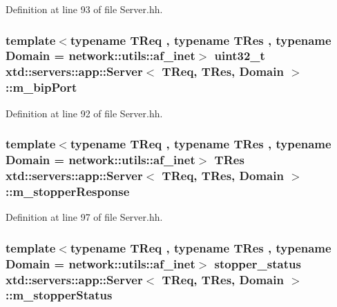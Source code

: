 Definition at line 93 of file Server.\-hh.

\hypertarget{classxtd_1_1servers_1_1app_1_1Server_a849adda20d929ad1116564177986e146}{
\subsubsection[{m\-\_\-bip\-Port}]{\setlength{\rightskip}{0pt plus 5cm}template$<$typename T\-Req , typename T\-Res , typename Domain  = network\-::utils\-::af\-\_\-inet$>$ uint32\-\_\-t {\bf xtd\-::servers\-::app\-::\-Server}$<$ T\-Req, T\-Res, Domain $>$\-::m\-\_\-bip\-Port\hspace{0.3cm}{\ttfamily [protected]}}}\label{classxtd_1_1servers_1_1app_1_1Server_a849adda20d929ad1116564177986e146}


Definition at line 92 of file Server.\-hh.

\hypertarget{classxtd_1_1servers_1_1app_1_1Server_afb80e8da001aafc8ffbf5b2dd8a9213e}{
\subsubsection[{m\-\_\-stopper\-Response}]{\setlength{\rightskip}{0pt plus 5cm}template$<$typename T\-Req , typename T\-Res , typename Domain  = network\-::utils\-::af\-\_\-inet$>$ T\-Res {\bf xtd\-::servers\-::app\-::\-Server}$<$ T\-Req, T\-Res, Domain $>$\-::m\-\_\-stopper\-Response\hspace{0.3cm}{\ttfamily [protected]}}}\label{classxtd_1_1servers_1_1app_1_1Server_afb80e8da001aafc8ffbf5b2dd8a9213e}


Definition at line 97 of file Server.\-hh.

\hypertarget{classxtd_1_1servers_1_1app_1_1Server_ae5180a630e0f23596a0909f845d00e69}{
\subsubsection[{m\-\_\-stopper\-Status}]{\setlength{\rightskip}{0pt plus 5cm}template$<$typename T\-Req , typename T\-Res , typename Domain  = network\-::utils\-::af\-\_\-inet$>$ stopper\-\_\-status {\bf xtd\-::servers\-::app\-::\-Server}$<$ T\-Req, T\-Res, Domain $>$\-::m\-\_\-stopper\-Status\hspace{0.3cm}{\ttfamily [protected]}}}\label{classxtd_1_1servers_1_1app_1_1Server_ae5180a630e0f23596a0909f845d00e69}


